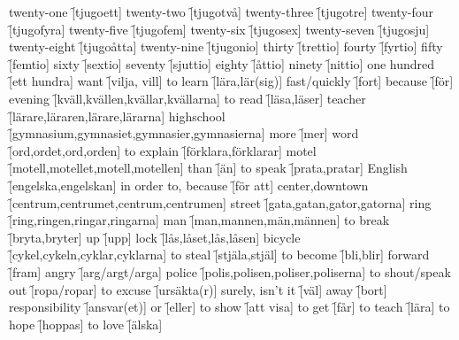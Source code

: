 \begin{questions}
    \begin{multicols}{2}
        \raggedcolumns
        \question twenty-one \f[tjugoett]
        \question twenty-two \f[tjugotvå]
        \question twenty-three \f[tjugotre]
        \question twenty-four \f[tjugofyra]
        \question twenty-five \f[tjugofem]
        \question twenty-six \f[tjugosex]
        \question twenty-seven \f[tjugosju]
        \question twenty-eight \f[tjugoåtta]
        \question twenty-nine \f[tjugonio]
        \question thirty \f[trettio]
        \question fourty \f[fyrtio]
        \question fifty \f[femtio]
        \question sixty \f[sextio]
        \question seventy \f[sjuttio]
        \question eighty \f[åttio]
        \question ninety \f[nittio]
        \question one hundred \f[ett hundra]
        \question want \f[vilja, vill]
        \question to learn \f[lära,lär(sig)]
        \question fast/quickly \f[fort]
        \question because \f[för]
        \question evening \f[kväll,kvällen,kvällar,kvällarna]
        \question to read \f[läsa,läser]
        \question teacher \f[lärare,läraren,lärare,lärarna]
        \question highschool \f[gymnasium,gymnasiet,gymnasier,gymnasierna]
        \question more \f[mer]
        \question word \f[ord,ordet,ord,orden]
        \question to explain \f[förklara,förklarar]
        \question motel \f[motell,motellet,motell,motellen]
        \question than \f[än]
        \question to speak \f[prata,pratar]
        \question English \f[engelska,engelskan]
        \question in order to, because \f[för att]
        \question center,downtown \f[centrum,centrumet,centrum,centrumen]
        \question street \f[gata,gatan,gator,gatorna]
        \question ring \f[ring,ringen,ringar,ringarna]
        \question man \f[man,mannen,män,männen]
        \question to break \f[bryta,bryter]
        \question up \f[upp]
        \question lock \f[lås,låset,lås,låsen]
        \question bicycle \f[cykel,cykeln,cyklar,cyklarna]
        \question to steal \f[stjäla,stjäl]
        \question to become \f[bli,blir]
        \question forward \f[fram]
        \question angry \f[arg/argt/arga]
        \question police \f[polis,polisen,poliser,poliserna]
        \question to shout/speak out \f[ropa/ropar]
        \question to excuse \f[ursäkta(r)]
        \question surely, isn't it \f[väl]
        \question away \f[bort]
        \question responsibility \f[ansvar(et)]
        \question or \f[eller]
        \question to show \f[att visa]
        \question to get \f[får]
        \question to teach \f[lära]
        \question to hope \f[hoppas]
        \question to love \f[älska]
    \end{multicols}
\end{questions}